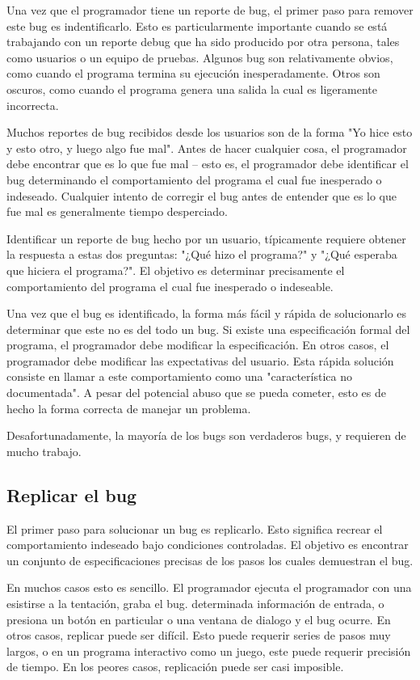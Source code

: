 \documentclass[12pt,a4paper]{report}
\begin{document}
Una vez que el programador tiene un reporte de bug, el primer paso para remover este bug es indentificarlo.  Esto es particularmente importante cuando se está trabajando con un reporte debug que ha sido producido por otra persona, tales como usuarios o un equipo de pruebas.  Algunos bug son relativamente obvios, como cuando el programa termina su ejecución inesperadamente.  Otros son oscuros, como cuando el programa genera una salida la cual es ligeramente incorrecta.

Muchos reportes de bug recibidos desde los usuarios son de la forma "Yo hice esto y esto otro, y luego algo fue mal".  Antes de hacer cualquier cosa, el programador debe encontrar que es lo que fue mal -- esto es, el programador debe identificar el bug determinando el comportamiento del programa el cual fue inesperado o indeseado.  Cualquier intento de corregir el bug antes de entender que es lo que fue mal es generalmente tiempo desperciado.

Identificar un reporte de bug hecho por un usuario, típicamente requiere obtener la respuesta a estas dos preguntas: "¿Qué hizo el programa?" y "¿Qué esperaba que hiciera el programa?".  El objetivo es determinar precisamente el comportamiento del programa el cual fue inesperado o indeseable.

Una vez que el bug es identificado, la forma más fácil y rápida de solucionarlo es determinar que este no es del todo un bug.  Si existe una especificación formal del programa, el programador debe modificar la especificación.  En otros casos, el programador debe modificar las expectativas del usuario.  Esta rápida solución consiste en llamar a este comportamiento como una "característica no documentada".  A pesar del potencial abuso que se pueda cometer,  esto es de hecho la forma correcta de manejar un problema.

Desafortunadamente, la mayoría de los bugs son verdaderos bugs, y requieren de mucho trabajo.


\subsection{Replicar el bug}

El primer paso para solucionar un bug es replicarlo.  Esto significa recrear el comportamiento indeseado bajo condiciones controladas.  El objetivo es encontrar un conjunto de especificaciones precisas de los pasos los cuales demuestran el bug.


En muchos casos esto es sencillo.  El programador ejecuta el programador con una esistirse a la tentación, graba el bug.  determinada información de entrada, o presiona un botón en particular o una ventana de dialogo y el bug ocurre.  En otros casos, replicar puede ser difícil.  Esto puede requerir series de pasos muy largos, o en un programa interactivo como un juego, este puede requerir precisión de tiempo.  En los peores casos, replicación puede ser casi imposible.
\end{document}
